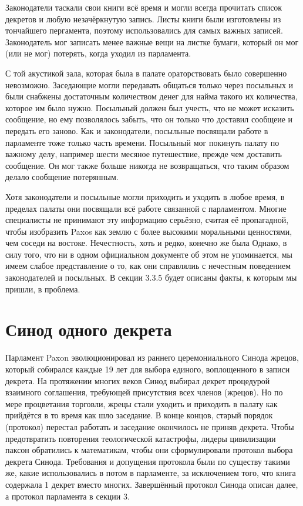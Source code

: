 Законодатели таскали свои книги всё время и могли всегда прочитать список декретов и любую незачёркнутую запись. Листы книги были изготовлены из тончайшего пергамента, поэтому использовались для самых важных записей. Законодатель мог записать менее важные вещи на листке бумаги, который он мог (или не мог) потерять, когда уходил из парламента.

С той акустикой зала, которая была в палате ораторствовать было совершенно невозможно. Заседающие могли передавать общаться только через посыльных и были снабжены достаточным количеством денег для найма такого их количества, которое им было нужно. Посыльный должен был учесть, что не может исказить сообщение, но ему позволялось забыть, что он только что доставил сообщеие и передать его заново. Как и законодатели, посыльные посвящали работе в парламенте тоже только часть времени. Посыльный мог покинуть палату по важному делу, например шести месяное путешествие, прежде чем доставить сообщение. Он мог также больше никогда не возвращаться, что таким образом делало сообщение потерянным.

Хотя законодатели и посыльные могли приходить и уходить в любое время, в пределах палаты они посвящали всё работе связанной с парламентом. Многие специалисты не принимают эту информацию серьёзно, считая её пропагадной, чтобы изобразить Paxos как землю с более высокими моральными ценностями, чем соседи на востоке. Нечестность, хоть и редко, конечно же была Однако, в силу того, что ни в одном официальном документе об этом не упоминается, мы имеем слабое представление о то, как они справлялиь с нечестным поведением законодателей и посыльных. В секции 3.3.5 будет описаны факты, к которым мы пришли, в проблема.

\section{Синод одного декрета}

Парламент Paxon эволюционировал из раннего церемониального Синода жрецов, который собирался каждые 19 лет для выбора единого, воплощенного в записи декрета. На протяжении многих веков Синод выбирал декрет процедурой взаимного соглашения, требующей присутствия всех членов (жрецов). Но по мере процветания торговли, жрецы стали уходить и приходить в палату как прийдётся в то время как шло заседание. В конце концов, старый порядок (протокол) перестал работать и заседание окончилось не приняв декрета. Чтобы предотвратить повторения теологической катастрофы, лидеры цивилизации паксон обратились к математикам, чтобы они сформулировали протокол выбора декрета Синода. Требования и допущения протокола были по существу такими же, какие использовались в потом в парламенте, за исключением того, что книга содержала 1 декрет вместо многих. Завершённый протокол Синода описан далее, а протокол парламента в секции 3.


